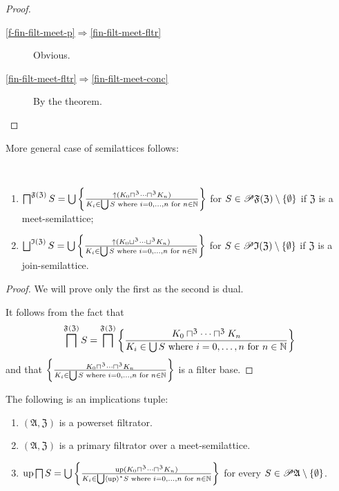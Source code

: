 \begin{proof}
~
\begin{description}
\item [{\ref{f-fin-filt-meet-p}$\Rightarrow$\ref{fin-filt-meet-fltr}}] Obvious.
\item [{\ref{fin-filt-meet-fltr}$\Rightarrow$\ref{fin-filt-meet-conc}}] By
the theorem.
\end{description}
\end{proof}
More general case of semilattices follows:
\begin{thm}\label{meet-prim-mlat}
~
\begin{enumerate}
\item $\bigsqcap^{\mathfrak{F}(\mathfrak{Z})}S=\bigcup\left\{ \frac{\uparrow(K_{0}\sqcap^{\mathfrak{Z}}\dots\sqcap^{\mathfrak{Z}}K_{n})}{K_{i}\in\bigcup S\text{ where }i=0,\dots,n\text{ for }n\in\mathbb{N}}\right\}$
for $S\in\mathscr{P}\mathfrak{F}(\mathfrak{Z})\setminus\{\emptyset\}$
if $\mathfrak{Z}$ is a meet-semilattice;
\item $\bigsqcup^{\mathfrak{I}(\mathfrak{Z})}S=\bigcup\setcond{\uparrow(K_{0}\sqcup^{\mathfrak{Z}}\dots\sqcup^{\mathfrak{Z}}K_{n})}{K_{i}\in\bigcup S\text{ where }i=0,\dots,n\text{ for }n\in\mathbb{N}}$
for $S\in\mathscr{P}\mathfrak{I}(\mathfrak{Z})\setminus\{\emptyset\}$
if $\mathfrak{Z}$ is a join-semilattice.
\end{enumerate}
\end{thm}
\begin{proof}
We will prove only the first as the second is dual.

It follows from the fact that
\[
\bigsqcap^{\mathfrak{F}(\mathfrak{Z})}S=\bigsqcap^{\mathfrak{F}(\mathfrak{Z})}\left\{ \frac{K_{0}\sqcap^{\mathfrak{Z}}\dots\sqcap^{\mathfrak{Z}}K_{n}}{K_{i}\in\bigcup S\text{ where }i=0,\dots,n\text{ for }n\in\mathbb{N}}\right\}
\]
and that $\left\{ \frac{K_{0}\sqcap^{\mathfrak{Z}}\dots\sqcap^{\mathfrak{Z}}K_{n}}{K_{i}\in\bigcup S\text{ where }i=0,\dots,n\text{ for }n\in\mathbb{N}}\right\}$
is a filter base.\end{proof}
\begin{cor}
\label{meet-filtx}The following is an implications tuple:
\begin{enumerate}
\item $(\mathfrak{A},\mathfrak{Z})$ is a powerset filtrator.
\item $(\mathfrak{A},\mathfrak{Z})$ is a primary filtrator over a meet-semilattice.
\item $\operatorname{up}\bigsqcap S=\bigcup\left\{ \frac{\operatorname{up}(K_{0}\sqcap^{\mathfrak{Z}}\dots\sqcap^{\mathfrak{Z}}K_{n})}{K_{i}\in\bigcup\left\langle \operatorname{up}\right\rangle ^{\ast}S\text{ where }i=0,\dots,n\text{ for }n\in\mathbb{N}}\right\}$
for every $S\in\mathscr{P}\mathfrak{A}\setminus\{\emptyset\}$.
\end{enumerate}
\end{cor}
